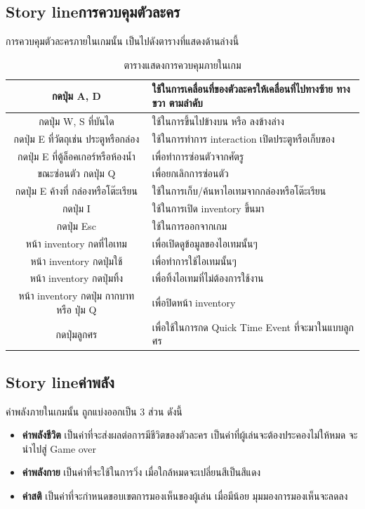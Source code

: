 \newpage
\subsection{\ifenglish Story line\else การควบคุมตัวละคร\fi }
การควบคุมตัวละครภายในเกมนั้น เป็นไปดังตารางที่แสดงด้านล่างนี้
\begin{table}[h]
    \centering
    \begin{tabular}[t]{|c|p{8cm}|}
    \hline
    กดปุ่ม A, D & ใช้ในการเคลื่อนที่ของตัวละครให้เคลื่อนที่ไปทางซ้าย ทางขวา ตามลำดับ\\
    \hline
    กดปุ่ม W, S ที่บันได& ใช้ในการขึ้นไปข้างบน หรือ ลงข้างล่าง\\
    \hline
    กดปุ่ม E ที่วัตถุเช่น ประตูหรือกล่อง& ใช้ในการทำการ interaction เปิดประตูหรือเก็บของ\\
    \hline
    กดปุ่ม E ที่ตู้ล็อคเกอร์หรือห้องน้ำ& เพื่อทำการซ่อนตัวจากศัตรู\\
    \hline
    ขณะซ่อนตัว กดปุ่ม Q& เพื่อยกเลิกการซ่อนตัว\\
    \hline
    กดปุ่ม E ค้างที่ กล่องหรือโต๊ะเรียน & ใช้ในการเก็บ/ค้นหาไอเทมจากกล่องหรือโต๊ะเรียน\\
    \hline
    กดปุ่ม I & ใช้ในการเปิด inventory ขึ้นมา\\
    \hline
    กดปุ่ม Esc& ใช้ในการออกจากเกม\\
    \hline
    หน้า inventory กดที่ไอเทม& เพื่อเปิดดูข้อมูลของไอเทมนั้นๆ\\
    \hline
    หน้า inventory กดปุ่มใช้& เพื่อทำการใช้ไอเทมนั้นๆ\\
    \hline
    หน้า inventory กดปุ่มทิ้ง& เพื่อทิ้งไอเทมที่ไม่ต้องการใช้งาน\\
    \hline
    หน้า inventory กดปุ่ม กากบาท หรือ ปุ่ม Q& เพื่อปิดหน้า inventory\\
    \hline
    กดปุ่มลูกศร& เพื่อใช้ในการกด Quick Time Event ที่จะมาในแบบลูกศร\\
    \hline
    \end{tabular}
    \caption[ตารางแสดงการควบคุมภายในเกม]{ตารางแสดงการควบคุมภายในเกม}
\end{table}

\subsection{\ifenglish Story line\else ค่าพลัง\fi }
ค่าพลังภายในเกมนั้น ถูกแบ่งออกเป็น 3 ส่วน ดังนี้
\begin{itemize}
    \item \textbf{ค่าพลังชีวิต} เป็นค่าที่จะส่งผลต่อการมีชีวิตของตัวละคร เป็นค่าที่ผู้เล่นจะต้องประคองไม่ให้หมด จะนำไปสู่ Game over
    \item \textbf{ค่าพลังกาย} เป็นค่าที่จะใช้ในการวิ่ง เมื่อใกล้หมดจะเปลี่ยนสีเป็นสีแดง
    \item \textbf{ค่าสติ} เป็นค่าที่จะกำหนดขอบเขตการมองเห็นของผู้เล่น เมื่อมีน้อย มุมมองการมองเห็นจะลดลง
\end{itemize}
